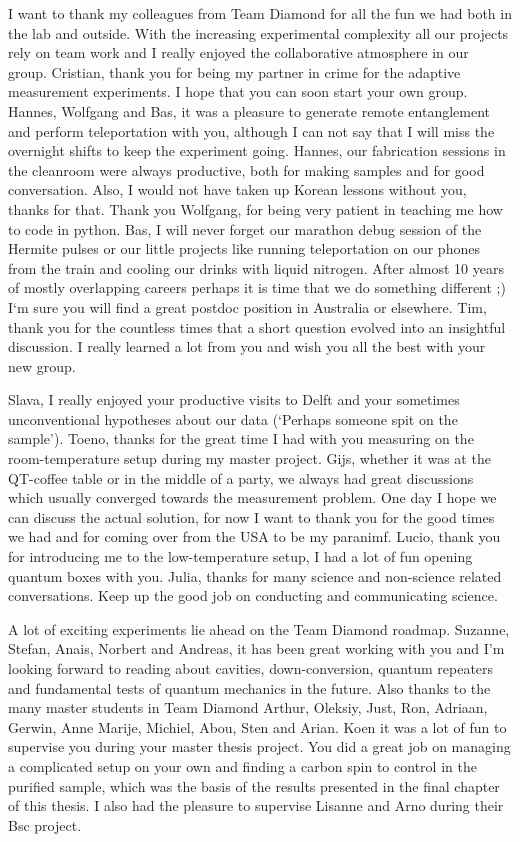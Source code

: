 I want to thank my colleagues from Team Diamond for all the fun we had both in the lab and outside. With the increasing experimental complexity all our projects rely on team work and I really enjoyed the collaborative atmosphere in our group. Cristian, thank you for being my partner in crime for the adaptive measurement experiments. I hope that you can soon start your own group. Hannes, Wolfgang and Bas, it was a pleasure to generate remote entanglement and perform teleportation with you, although I can not say that I will miss the overnight shifts to keep the experiment going. Hannes, our fabrication sessions in the cleanroom were always productive, both for making samples and for good conversation. Also, I would not have taken up Korean lessons without you, thanks for that. Thank you Wolfgang, for being very patient in teaching me how to code in python. Bas, I will never forget our marathon debug session of the Hermite pulses or our little projects like running teleportation on our phones from the train and cooling our drinks with liquid nitrogen. After almost 10 years of mostly overlapping careers perhaps it is time that we do something different ;) I`m sure you will find a great postdoc position in Australia or elsewhere. Tim, thank you for the countless times that a short question evolved into an insightful discussion. I really learned a lot from you and wish you all the best with your new group.

Slava, I really enjoyed your productive visits to Delft and your sometimes unconventional hypotheses about our data (`Perhaps someone spit on the sample'). Toeno, thanks for the great time I had with you measuring on the room-temperature setup during my master project. Gijs, whether it was at the QT-coffee table or in the middle of a party, we always had great discussions which usually converged towards the measurement problem. One day I hope we can discuss the actual solution, for now I want to thank you for the good times we had and for coming over from the USA to be my paranimf. Lucio, thank you for introducing me to the low-temperature setup, I had a lot of fun opening quantum boxes with you. Julia, thanks for many science and non-science related conversations. Keep up the good job on conducting and communicating science. 

A lot of exciting experiments lie ahead on the Team Diamond roadmap. Suzanne, Stefan, Anais, Norbert and Andreas, it has been great working with you and I'm looking forward to reading about cavities, down-conversion, quantum repeaters and fundamental tests of quantum mechanics in the future. Also thanks to the many master students in Team Diamond Arthur, Oleksiy, Just, Ron, Adriaan, Gerwin, Anne Marije, Michiel, Abou, Sten and Arian. Koen it was a lot of fun to supervise you during your master thesis project. You did a great job on managing a complicated setup on your own and finding a carbon spin to control in the purified sample, which was the basis of the results presented in the final chapter of this thesis. I also had the pleasure to supervise Lisanne and Arno during their Bsc project. \\

